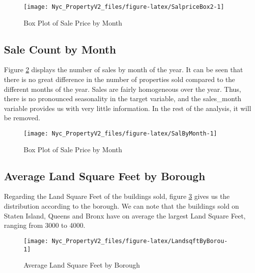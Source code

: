 \documentclass[
]{article}
\begin{document}
\begin{figure}[H]

{\centering \texttt{[image: Nyc\_PropertyV2\_files/figure-latex/SalpriceBox2-1]} 

}

\caption{Box Plot of Sale Price by Month}\label{fig:SalpriceBox2}
\end{figure}

\subsection{Sale Count by Month}\label{sale-count-by-month}

Figure \ref{fig:SalByMonth} displays the number of sales by month of the year. It can be seen that there is no great difference in the number of properties sold compared to the different months of the year. Sales are fairly homogeneous over the year. Thus, there is no pronounced seasonality in the target variable, and the sales\_month variable provides us with very little information. In the rest of the analysis, it will be removed.

\begin{figure}[H]

{\centering \texttt{[image: Nyc\_PropertyV2\_files/figure-latex/SalByMonth-1]} 

}

\caption{Box Plot of Sale Price by Month}\label{fig:SalByMonth}
\end{figure}

\subsection{Average Land Square Feet by Borough}\label{average-land-square-feet-by-borough}

Regarding the Land Square Feet of the buildings sold, figure \ref{fig:LandsqftByBorou} gives us the distribution according to the borough. We can note that the buildings sold on Staten Island, Queens and Bronx have on average the largest Land Square Feet, ranging from 3000 to 4000.

\begin{figure}[H]

{\centering \texttt{[image: Nyc\_PropertyV2\_files/figure-latex/LandsqftByBorou-1]} 

}

\caption{Average Land Square Feet by Borough}\label{fig:LandsqftByBorou}
\end{figure}
\end{document}

